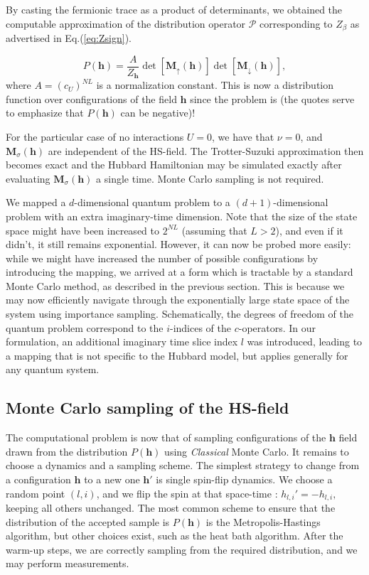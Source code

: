 By casting the fermionic trace as a product of determinants, we obtained the computable approximation of the distribution operator $\mathcal{P}$ corresponding to $Z_{\beta}$ as advertised in Eq.(\ref{eq:Zsign}).

\begin{equation}
P(\bm h) = \frac{A}{Z_{\bm h}} \det [ \bm M_{\uparrow}(\bm h) ] \det [ \bm M_{\downarrow}(\bm h) ] ,
\end{equation}
where $A = (c_U)^{NL}$ is a normalization constant.
This is now a distribution function over configurations of the field $\bm h$ since the problem is  (the quotes serve to emphasize that $P (\bm h )$ can be negative)!

For the particular case of no interactions $U = 0$, we have that $\nu = 0$, and $\bm M_\sigma (\bm h)$ are independent of the HS-field. 
The Trotter-Suzuki approximation then becomes exact and the Hubbard Hamiltonian may be simulated exactly after evaluating $\bm M_\sigma (\bm h)$ a single time.
Monte Carlo sampling is not required.

We mapped a $d$-dimensional quantum problem to a $(d+1)$-dimensional  problem with an extra imaginary-time dimension.
Note that the size of the state space might have been increased to $2^{NL}$ (assuming that $L > 2$), and even if it didn't, it still remains exponential.
However, it can now be probed more easily: while we might have increased the number of possible configurations by introducing the mapping, we arrived at a form which is tractable by a standard Monte Carlo method, as described in the previous section.
This is because we may now efficiently navigate through the exponentially large state space of the system using importance sampling.
Schematically, the degrees of freedom of the quantum problem correspond to the $i$-indices of the $c$-operators.
In our formulation, an additional imaginary time slice index $l$ was introduced, leading to a mapping that is not specific to the Hubbard model, but applies generally for any quantum system.

\subsection{Monte Carlo sampling of the HS-field}
\label{subsec:mc_hs}

The computational problem is now that of sampling configurations of the $\bm h$ field drawn from the distribution $P(\bm h)$ using \emph{Classical} Monte Carlo.
It remains to choose a dynamics and a sampling scheme. The simplest strategy to change from a configuration $\bm h$ to a new one $\bm h'$ is single spin-flip dynamics. We choose a random point $(l, i)$, and we flip the spin at that space-time  :
$
h_{l, i}' = - h_{l, i},
$
keeping all others unchanged.
The most common scheme to ensure that the distribution of the accepted sample is $P(\bm h)$ is the Metropolis-Hastings algorithm, but other choices exist, such as the heat bath algorithm.
After the warm-up steps, we are correctly sampling from the required distribution, and we may perform measurements.

